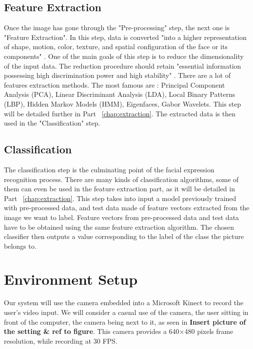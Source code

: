 \subsection{Feature Extraction}

\vspace{\baselineskip}
\noindent Once the image has gone through the "Pre-processing" step, the next one is "Feature Extraction". In this step, data is converted "into a higher representation of shape, motion, color, texture, and spatial configuration of the face or its components" \cite{CHI03}. One of the main goals of this step is to reduce the dimensionality of the input data. The reduction procedure should retain "essential information possessing high discrimination power and high stability" \cite{CHI03}. There are a lot of features extraction methods. The most famous are : Principal Component Analysis (PCA), Linear Discriminant Analysis (LDA), Local Binary Patterns (LBP), Hidden Markov Models (HMM), Eigenfaces, Gabor Wavelets. This step will be detailed further in Part ~\ref{chap:extraction}. The extracted data is then used in the "Classification" step.
\newline

\subsection{Classification}

\noindent The classification step is the culminating point of the facial expression recognition process. There are many kinds of classification algorithms, some of them can even be used in the feature extraction part, as it will be detailed in Part ~\ref{chap:extraction}. This step takes into input a model previously trained with pre-processed data, and test data made of feature vectors extracted from the image we want to label. Feature vectors from pre-processed data and test data have to be obtained using the same feature extraction algorithm. The chosen classifier then outputs a value corresponding to the label of the class the picture belongs to.

\section{Environment Setup}

\vspace{\baselineskip}
\noindent Our system will use the camera embedded into a Microsoft Kinect to record the user's video input. We will consider a casual use of the camera, the user sitting in front of the computer, the camera being next to it, as seen in \textbf{\color{red} Insert picture of the setting \& ref to figure}. This camera provides a 640$\times$480 pixels frame resolution, while recording at 30 FPS.
\newline

